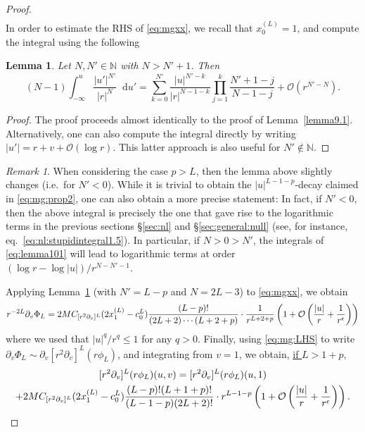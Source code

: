 \documentclass[11pt,english]{article}
\numberwithin{equation}{section}
\newtheorem{lemma}{Lemma}[section]
\theoremstyle{remark}
\newtheorem{rem}{Remark}[section]
\theoremstyle{plain}
\newenvironment{nalign}{
    \begin{equation}
    \begin{aligned}
}{
    \end{aligned}
    \end{equation}
    \ignorespacesafterend
}
\theoremstyle{remark}
\newcommand{\dd}{\mathop{}\!\mathrm{d}}
\newcommand{\pv}{\partial_v}
\renewcommand{\(}{\left(}
\renewcommand{\)}{\right)}
\begin{document}
\begin{proof}
\begin{align}
\end{align}
In order to estimate the RHS of \eqref{eq:mgxx}, we recall that $x_0^{(L)}=1$, and compute the integral using the following
\begin{lemma}\label{lemma10.1}
Let $N, N'\in \mathbb{N}$ with $N>N'+1$. Then
\begin{equation}\label{eq:lemma101}
(N-1)\int_{-\infty}^u\frac{|u'|^{N'}}{|r|^{N}}\dd u'=
\sum_{k=0}^{N'}\frac{|u|^{N'-k}}{|r|^{N-1-k}}\prod_{j=1}^k\frac{N'+1-j}{N-1-j}+\mathcal O(r^{N'-N}).
\end{equation}
\end{lemma}
\begin{proof}
The proof proceeds almost identically to the proof of Lemma~\ref{lemma9.1}. 
Alternatively, one can also compute the integral directly by writing $|u'|=r+v+\mathcal O(\log r)$. 
This latter approach is also useful for $N'\notin \mathbb N$.
\end{proof}
\begin{rem}\label{rem10}
When considering the case $p>L$, then the lemma above slightly changes (i.e.\ for $N'<0$). 
While it is trivial to obtain the $|u|^{L-1-p}$-decay claimed in \eqref{eq:mg:prop2}, one can also obtain a more precise statement:
 In fact, if $N'<0$, then the above integral is precisely the one that gave rise to the logarithmic terms in the previous sections \S\ref{sec:nl} and \S\ref{sec:general:null} (see, for instance, eq.\ \eqref{eq:nl:stupidintegral1.5}). 
 In particular, if $N>0>N'$, the integrals of \eqref{eq:lemma101} will lead to logarithmic terms at order $(\log r-\log|u|)/r^{N-N'-1}$.
\end{rem}
Applying Lemma~\ref{lemma10.1} (with $N'=L-p$ and $N=2L-3$) to \eqref{eq:mgxx}, we obtain 
\begin{nalign}\label{eq:mg:yy}
r^{-2L}\pv\Phi_L
=2M\cv{L}(2x_1^{(L)}-c_0^L)\frac{(L-p)!}{(2L+2)\cdots (L+2+p)}\cdot\frac{1}{r^{L+2+p}}\left(1+\mathcal{O}\left(\frac{|u|}{r}+\frac{1}{r^{\epsilon}}\right)\right)%
\end{nalign}
where we used that $|u|^q/r^q\leq 1$ for any $q>0$.
Finally, using \eqref{eq:mg:LHS} to write $\pv\Phi_L\sim \pv[r^2\pv]^L(r\phi_L)$, and integrating from $v=1$, we obtain, \underline{if $L>1+p$},
\begin{multline}\label{eq:mg:pvLbound1}
[r^2\pv]^L(r\phi_L)(u,v)=[r^2\pv]^L(r\phi_L)(u,1)\\
+2M\cv{L}(2x_1^{(L)}-c_0^L)\frac{(L-p)!(L+1+p)!}{(L-1-p)(2L+2)!}\cdot r^{L-1-p} \left(1+\mathcal{O}\left(\frac{|u|}{r}+\frac{1}{r^{\epsilon}}\right)\right).
\end{multline}


\end{proof}
\end{document}
